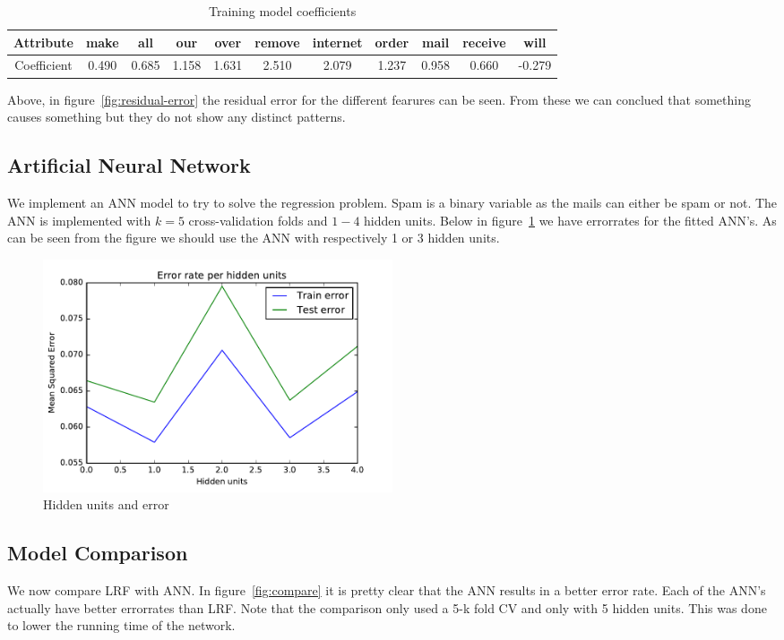 \documentclass[11pt, paper=a4]{article}
\begin{document}
\begin{table}[h]
  \centering
  \begin{tabular}{c|c|c|c|c|c|c|c|c|c|c}
    \hline Attribute & make & all & our & over & remove & internet &
    order & mail & receive & will \\ \hline Coefficient & 0.490 &
    0.685 & 1.158 & 1.631 & 2.510 & 2.079 & 1.237 & 0.958 & 0.660 &
    -0.279 \\ \hline
  \end{tabular}
  \caption{Training model coefficients}
\end{table}

Above, in figure~\ref{fig:residual-error} the residual error for the different fearures can
be seen. From these we can conclued that something causes something
but they do not show any distinct patterns.

\subsection{Artificial Neural Network}
We implement an ANN model to try to solve the regression problem. Spam
is a binary variable as the mails can either be spam or not. The ANN
is implemented with $k=5$ cross-validation folds and $1-4$ hidden
units. Below in figure~\ref{fig:annhid} we have errorrates for the
fitted ANN's.  As can be seen from the figure we should use the ANN
with respectively 1 or 3 hidden units.


\begin{figure}[h]
  \centering
  \includegraphics[width = 0.5\textwidth]{../../src/img/ann_regression_hid_units.pdf}
  \caption{Hidden units and error}
  \label{fig:annhid}
\end{figure}

\subsection{Model Comparison}
We now compare LRF with ANN. In figure~\ref{fig:compare} it is pretty
clear that the ANN results in a better error rate. Each of the ANN's
actually have better errorrates than LRF. Note that the comparison
only used a 5-k fold CV and only with 5 hidden units. This was done to
lower the running time of the network.
\end{document}
